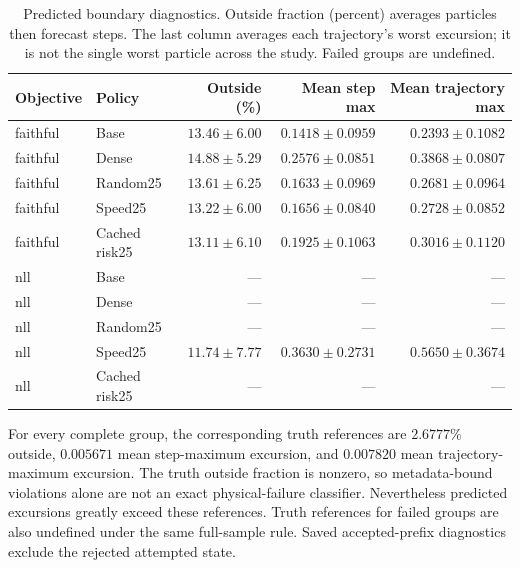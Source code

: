 \begin{table}[t]
\centering\small
\caption{Predicted boundary diagnostics. Outside fraction (percent) averages particles then forecast steps. The last column averages each trajectory's worst excursion; it is not the single worst particle across the study. Failed groups are undefined.}
\label{tab:full-boundaries}
\begin{tabular}{llrrr}
\toprule
Objective & Policy & Outside (\%) & Mean step max & Mean trajectory max\\
\midrule
faithful & Base & $13.46\pm6.00$ & $0.1418\pm0.0959$ & $0.2393\pm0.1082$\\
faithful & Dense & $14.88\pm5.29$ & $0.2576\pm0.0851$ & $0.3868\pm0.0807$\\
faithful & Random25 & $13.61\pm6.25$ & $0.1633\pm0.0969$ & $0.2681\pm0.0964$\\
faithful & Speed25 & $13.22\pm6.00$ & $0.1656\pm0.0840$ & $0.2728\pm0.0852$\\
faithful & Cached risk25 & $13.11\pm6.10$ & $0.1925\pm0.1063$ & $0.3016\pm0.1120$\\
nll & Base & --- & --- & ---\\
nll & Dense & --- & --- & ---\\
nll & Random25 & --- & --- & ---\\
nll & Speed25 & $11.74\pm7.77$ & $0.3630\pm0.2731$ & $0.5650\pm0.3674$\\
nll & Cached risk25 & --- & --- & ---\\
\bottomrule
\end{tabular}
\end{table}


For every complete group, the corresponding truth references are $2.6777\%$
outside, $0.005671$ mean step-maximum excursion, and $0.007820$ mean
trajectory-maximum excursion. The truth outside fraction is nonzero, so
metadata-bound violations alone are not an exact physical-failure classifier.
Nevertheless predicted excursions greatly exceed these references. Truth
references for failed groups are also undefined under the same full-sample
rule. Saved accepted-prefix diagnostics exclude the rejected attempted state.


